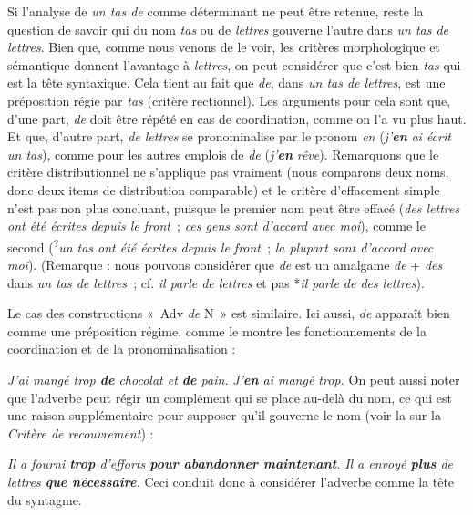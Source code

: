 {    Si l’analyse de \textit{un tas de} comme déterminant ne peut être retenue, reste la question de savoir qui du nom \textit{tas} ou de \textit{lettres} gouverne l’autre dans \textit{un tas de lettres}. Bien que, comme nous venons de le voir, les critères morphologique et sémantique donnent l’avantage à \textit{lettres}, on peut considérer que c’est bien \textit{tas} qui est la tête syntaxique. Cela tient au fait que \textit{de}, dans \textit{un tas de lettres}, est une préposition régie par \textit{tas} (critère rectionnel). Les arguments pour cela sont que, d’une part, \textit{de} doit être répété en cas de coordination, comme on l’a vu plus haut. Et que, d’autre part, \textit{de lettres} se pronominalise par le pronom \textit{en} (\textit{j’}\textbf{\textit{en}} \textit{ai écrit un tas}), comme pour les autres emplois de \textit{de} (\textit{j’}\textbf{\textit{en}} \textit{rêve}). Remarquons que le critère distributionnel ne s’applique pas vraiment (nous comparons deux noms, donc deux items de distribution comparable) et le critère d’effacement simple n’est pas non plus concluant, puisque le premier nom peut être effacé (\textit{des lettres ont été écrites depuis le front~}; \textit{ces gens sont d’accord} \textit{avec moi}), comme le second (\textsuperscript{?}\textit{un tas ont été écrites depuis le front~}; \textit{la plupart sont d’accord} \textit{avec moi}). (Remarque : nous pouvons considérer que \textit{de} est un amalgame \textit{de} + \textit{des} dans \textit{un tas de lettres~}; cf. \textit{il parle de lettres} et pas *\textit{il parle de des lettres}).

    Le cas des constructions «~Adv \textit{de} N~» est similaire. Ici aussi, \textit{de} apparaît bien comme une préposition régime, comme le montre les fonctionnements de la coordination et de la pronominalisation :
    
    \ea
      \ea \textit{{J’ai mangé trop} \textbf{{de} } {chocolat et} \textbf{{de}}  {pain.}}
      \ex \textit{{J’}\textbf{{en}} ai mangé trop.}
      \z
    \z
    On peut aussi noter que l’adverbe peut régir un complément qui se place au-delà du nom, ce qui est une raison supplémentaire pour supposer qu’il gouverne le nom (voir la  sur la \textit{Critère de recouvrement}) :
    
    \ea
      \ea \textit{{Il a fourni} \textbf{{trop}}  {d’efforts} \textbf{{pour abandonner maintenant}}.}
      \ex \textit{{Il a envoyé} \textbf{{plus}}  {de lettres} \textbf{{que nécessaire}}.}
      \z
    \z
    Ceci conduit donc à considérer l’adverbe comme la tête du syntagme.

}
